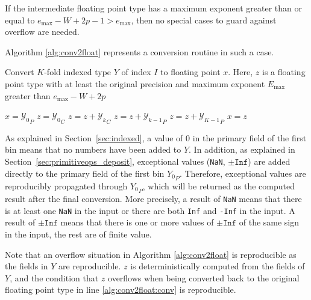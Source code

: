     If the intermediate floating point type has a maximum exponent greater than
    or equal to $e_{\max} - W + 2  p - 1 > e_{\max}$, then no special cases to guard
    against overflow are needed.

    Algorithm \ref{alg:conv2float} represents a conversion routine in such a case.

    \begin{samepage}
    \begin{alg}
      Convert $K$-fold indexed type $Y$ of index $I$ to floating point $x$.
      Here, $z$ is a floating point type with at least the original precision
      and maximum exponent $E_{\max}$ greater than $e_{\max} - W + 2  p$
      \begin{algorithmic}[1]
            \State $x = {\mathcal{Y}_0}_P$
            \State \Return
          \EndIf
          \State $z = {\mathcal{Y}_0}_C$
            \State $z = z + {\mathcal{Y}_k}_C$
            \State $z = z + {\mathcal{Y}_{k - 1}}_P$
          \EndFor
          \State $z = z + {\mathcal{Y}_{K - 1}}_P$
          \State $x = z$ \label{alg:conv2float:conv}
        \EndFunction
      \end{algorithmic}
      \label{alg:conv2float}
    \end{alg}
    \end{samepage}

    As explained in Section~\ref{sec:indexed}, a value of $0$ in the primary field
    of the first bin means that no numbers have been added to $Y$.
    In addition, as explained in Section~\ref{sec:primitiveops_deposit}, exceptional values
    (\texttt{NaN}, $\pm \texttt{Inf}$) are added directly to the primary field
    of the first bin ${Y_0}_P$. Therefore, exceptional values are reproducibly
    propagated through ${Y_0}_P$, which will be returned as the computed
    result after the final conversion.
    More precisely, a result of \texttt{NaN} means that there is at least
    one \texttt{NaN} in the input or there are both \texttt{Inf} and \texttt{-Inf}
    in the input. A result of $\pm \texttt{Inf}$ means that there is 
    one or more values of $\pm \texttt{Inf}$ of the same sign in the input,
    the rest are of finite value.

    Note that an overflow situation in Algorithm \ref{alg:conv2float} is
    reproducible as the fields in $Y$ are reproducible. $z$ is
    deterministically computed from the fields of $Y$, and the condition that
    $z$ overflows when being converted back to the original floating point type
    in line \ref{alg:conv2float:conv} is reproducible.

